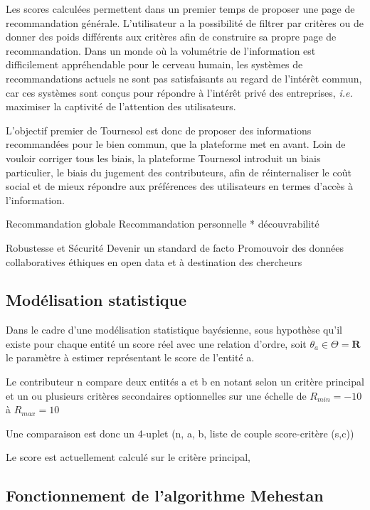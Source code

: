 Les scores calculées permettent dans un premier temps de proposer une page de recommandation générale. L'utilisateur a la possibilité de filtrer par critères ou de donner des poids différents aux critères afin de construire sa propre page de recommandation. Dans un monde où la volumétrie de l'information est difficilement appréhendable pour le cerveau humain, les systèmes de recommandations actuels ne sont pas satisfaisants au regard de l'intérêt commun, car ces systèmes sont conçus pour répondre à l'intérêt privé des entreprises, \textit{i.e.} maximiser la captivité de l'attention des utilisateurs. 

L'objectif premier de Tournesol est donc de proposer des informations recommandées pour le bien commun, que la plateforme met en avant. Loin de vouloir corriger tous les biais, la plateforme Tournesol introduit un biais particulier, le biais du jugement des contributeurs, afin de réinternaliser le coût social et de mieux répondre aux préférences des utilisateurs en termes d'accès à l'information. 

Recommandation globale
Recommandation personnelle * découvrabilité

Robustesse et Sécurité
Devenir un standard de facto
Promouvoir des données collaboratives éthiques en open data et à destination des chercheurs

\subsection{Modélisation statistique}

Dans le cadre d'une modélisation statistique bayésienne, sous hypothèse qu'il existe pour chaque entité un score réel avec une relation d'ordre, soit $\theta_{a}\in\Theta=\mathbf{R}$ le paramètre à estimer représentant le score de l'entité a.

Le contributeur n compare deux entités a et b en notant selon un critère principal et un ou plusieurs critères secondaires optionnelles sur une échelle de $R_{min}=-10$ à $R_{max}=10$

Une comparaison est donc un 4-uplet (n, a, b, liste de couple score-critère (s,c))

Le score est actuellement calculé sur le critère principal,

\subsection{Fonctionnement de l'algorithme Mehestan}

